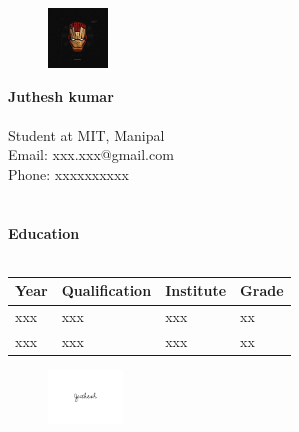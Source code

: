 \documentclass{article}
\begin{document}
\pagestyle{empty}
\begin{figure}
    \includegraphics[width=60px]{JKLogo.png}
\end{figure}
\textbf{\huge{Juthesh kumar}}\\\\
Student at MIT, Manipal\\
Email: xxx.xxx@gmail.com\\
Phone: xxxxxxxxxx\\\\\\
\textbf{\Large{Education}}\\\\
\begin{tabular}{|p{0.5in}|p{1.5in}|p{2in}|p{0.5in}|}
    \hline
    Year & Qualification & Institute & Grade\\
    \hline
    xxx & xxx & xxx & xx\\
    \hline
    xxx & xxx & xxx & xx\\
    \hline
\end{tabular}
\vfill
\begin{figure}[h!]
    \flushright
    \includegraphics[width=75px]{signature.jpeg}
\end{figure}
\end{document}
